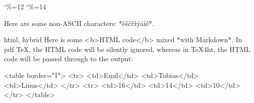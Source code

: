 \documentclass{book}
\begin{document}

\catcode`\%=12\relax
{}
\catcode`\%=14\relax

\begin{markdown}
Here are some non-ASCII characters: *ěščřžýáíé*.
\end{markdown}

\begin{markdown*}{html, hybrid}
Here is some <b>HTML code</b> mixed *with Markdown*. In pdf \TeX, the HTML code
will be silently ignored, whereas in \TeX 4ht, the HTML code will be passed
through to the output:

<table border="1">
  <tr>
    <td>Emil</td>
    <td>Tobias</td>
    <td>Linus</td>
  </tr>
  <tr>
    <td>16</td>
    <td>14</td>
    <td>10</td>
  </tr>
</table>
\end{markdown*}
\end{document}
